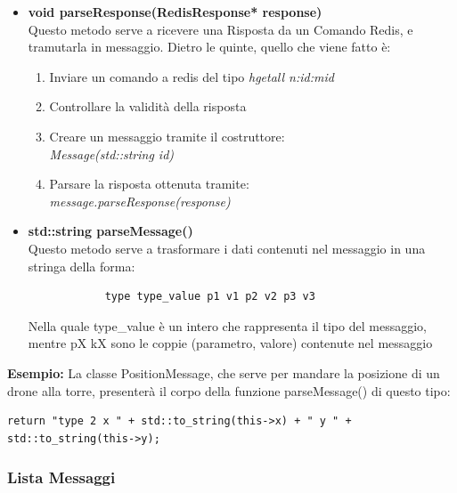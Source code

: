 \documentclass[a4paper, 11pt]{article}
\begin{document}
\begin{itemize}
    \item \textbf{void parseResponse(RedisResponse* response)}\\
        Questo metodo serve a ricevere una Risposta da un Comando Redis, e tramutarla in messaggio. Dietro le quinte, quello che viene fatto è:
        \begin{enumerate}
            \item Inviare un comando a redis del tipo \textit{hgetall n:id:mid}
            \item Controllare la validità della risposta
            \item Creare un messaggio tramite il costruttore:\\ \textit{Message(std::string id)}
            \item Parsare la risposta ottenuta tramite: \\ \textit{message.parseResponse(response)}
        \end{enumerate}
    \item\textbf{std::string parseMessage()}\\
        Questo metodo serve a trasformare i dati contenuti nel messaggio in una stringa della forma:
        \begin{verbatim}
            type type_value p1 v1 p2 v2 p3 v3
        \end{verbatim}
        Nella quale type\_value è un intero che rappresenta il tipo del messaggio, mentre pX kX sono le coppie (parametro, valore) contenute nel messaggio

\end{itemize}



\textbf{Esempio:} La classe PositionMessage, che serve per mandare la posizione di un drone alla torre, presenterà il corpo della funzione parseMessage() di questo tipo:
\begin{lstlisting}[style=customcpp, caption={da tower.cpp}]
    return "type 2 x " + std::to_string(this->x) + " y " + std::to_string(this->y);
\end{lstlisting}
\subsubsection{Lista Messaggi}

\end{document}
